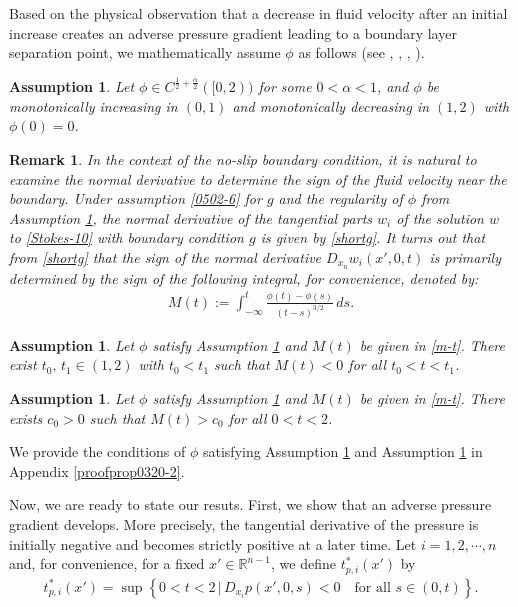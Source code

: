 \documentclass{amsart}
\newtheorem{assumption}[defn]{Assumption}
\newtheorem{remark}[defn]{Remark}
\numberwithin{equation}{section}
\newcommand{\bket}[1]{\left\{ #1 \right\}}
\newcommand {\al}{\alpha}
\begin{document}
Based on the physical observation that a decrease in fluid velocity after an initial increase creates an adverse pressure gradient leading to a boundary layer separation point, we mathematically assume $\phi$ as follows  (see \cite{P}, \cite{SG1},  \cite{SG}, \cite{St}).   
\begin{assumption}\label{assume1}
Let $\phi \in C^{\frac12 +\frac{\al}2} ([0, 2 ) )$ for some $ 0 < \al  <1$,  and $ \phi$ be monotonically increasing in $(0,1)$ and monotonically decreasing in $(1,2)$ with $\phi(0) =0$.   
\end{assumption}



\begin{remark}
In the context of the no-slip boundary condition, it is natural to examine the normal derivative to determine the sign of the fluid velocity near the boundary. 
Under assumption \eqref{0502-6} for $g$ and the regularity of $\phi$ from  Assumption \ref{assume1}, the normal derivative of the tangential parts $w_i$  of the solution $w$ to \eqref{Stokes-10} with boundary condition $g$ is given by \eqref{shortg}. It turns out that from \eqref{shortg} that the sign of the normal derivative $D_{x_n} w_i (x', 0, t)$ is primarily determined by the sign of the following integral, for convenience, denoted by:
\begin{align}\label{m-t}
M(t) := \int_{-\infty}^t \frac{\phi(t) - \phi(s)}{(t - s)^{3/2}} \, ds.
\end{align}
\end{remark}
 


 \begin{assumption}\label{assume2}
 Let $\phi$ satisfy Assumption \ref{assume1} and $M(t)$ be given in \eqref{m-t}.    There exist  $ t_0, \, t_1 \in (1,2)$  with $ t_0 < t_1$  such that $ M(t) <0$ for all $ t_0 < t < t_1$.
 \end{assumption}

 
  

\begin{assumption}\label{assume3}
 Let $\phi$ satisfy Assumption \ref{assume1}  and $M(t)$ be given in \eqref{m-t}. There exists $ c_0> 0$ such that  $M(t) > c_0$ for all $ 0 < t <2$.
 \end{assumption}

We provide the conditions of $\phi$ satisfying Assumption \ref{assume2} and Assumption \ref{assume3} in Appendix \ref{proofprop0320-2}.

Now, we are ready to state our resuts.
First, we show that an adverse pressure gradient develops. More precisely, the tangential derivative of the pressure is initially negative and becomes strictly positive at a later time.  Let $i=1,2, \cdots, n$ and, for convenience, for a  fixed $x'\in \mathbb R^{n-1}$, we define $t^*_{p,i} (x')$ by
 \begin{align}\label{t-p*}
t^*_{p,i}(x')   = \sup \bket{ 0 < t< 2 \, | \, D_{x_i} p(x',0,s) <0 \quad \mbox{for all } s\in (0, t)}.
\end{align}
\end{document}
